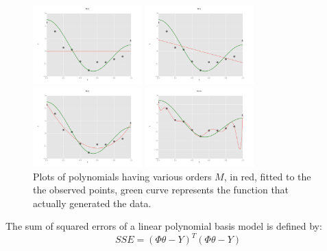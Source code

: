 \documentclass[10pt]{article}
\begin{document}
\begin{figure}[ht]
	\centering
	\begin{minipage}[b]{.24\linewidth}
		\includegraphics[width=1\linewidth, height=1.2in]{figures/M0.png}
		\caption*{$M=0$}
	\end{minipage}
	\begin{minipage}[b]{.24\linewidth}
		\includegraphics[width=1\linewidth, height=1.2in]{figures/M1.png}
			\caption*{$M=1$}
	\end{minipage}
	\begin{minipage}[b]{.24\linewidth}
		\includegraphics[width=1\linewidth, height=1.2in]{figures/M3.png}
		\caption*{$M=3$}
	\end{minipage}
	\begin{minipage}[b]{.24\linewidth}
		\includegraphics[width=1\linewidth, height=1.2in]{figures/M10.png}
		\caption*{$M=10$}
	\end{minipage}
	\caption{Plots of polynomials having various orders $M$, in red, fitted to the the observed points, green curve represents the function that actually generated the data.} 
\end{figure}


The sum of squared errors of a linear polynomial basis model is defined by: 
\begin{equation*}
	SSE=(\Phi \theta-Y)^T(\Phi \theta-Y)
\end{equation*}
\end{document}
